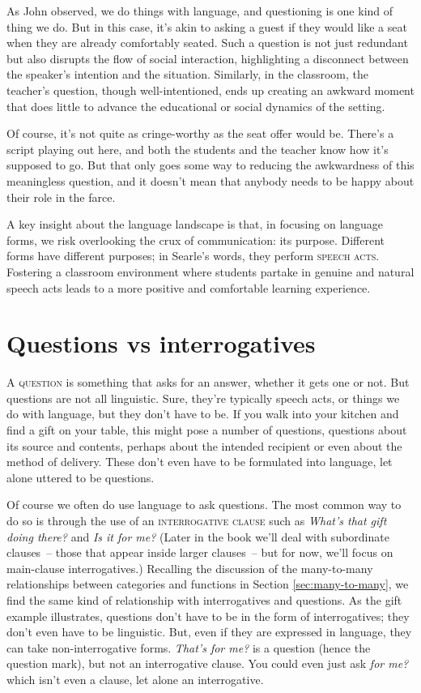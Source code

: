 As John \citet{searle1969} observed, we do things with language, and questioning is one kind of thing we do. But in this case, it's akin to asking a guest if they would like a seat when they are already comfortably seated. Such a question is not just redundant but also disrupts the flow of social interaction, highlighting a disconnect between the speaker's intention and the situation. Similarly, in the classroom, the teacher's question, though well-intentioned, ends up creating an awkward moment that does little to advance the educational or social dynamics of the setting.

Of course, it's not quite as cringe-worthy as the seat offer would be. There's a script playing out here, and both the students and the teacher know how it's supposed to go. But that only goes some way to reducing the awkwardness of this meaningless question, and it doesn't mean that anybody needs to be happy about their role in the farce.

A key insight about the language landscape is that, in focusing on language forms, we risk overlooking the crux of communication: its purpose. Different forms have different purposes; in Searle's words, they perform \textsc{speech acts}. Fostering a classroom environment where students partake in genuine and natural speech acts leads to a more positive and comfortable learning experience.

\section{Questions vs interrogatives}

A \textsc{question} is something that asks for an answer, whether it gets one or not. But questions are not all linguistic. Sure, they're typically speech acts, or things we do with language, but they don't have to be. If you walk into your kitchen and find a gift on your table, this might pose a number of questions, questions about its source and contents, perhaps about the intended recipient or even about the method of delivery. These don't even have to be formulated into language, let alone uttered to be questions.

Of course we often do use language to ask questions. The most common way to do so is through the use of an \textsc{interrogative clause} such as \textit{What's that gift doing there?} and \textit{Is it for me?} (Later in the book we'll deal with subordinate clauses~-- those that appear inside larger clauses~-- but for now, we'll focus on main-clause interrogatives.) Recalling the discussion of the many-to-many relationships between categories and functions in Section \ref{sec:many-to-many}, we find the same kind of relationship with interrogatives and questions. As the gift example illustrates, questions don't have to be in the form of interrogatives; they don't even have to be linguistic. But, even if they are expressed in language, they can take non-interrogative forms. \textit{That's for me?} is a question (hence the question mark), but not an interrogative clause. You could even just ask \textit{for me?} which isn't even a clause, let alone an interrogative.

